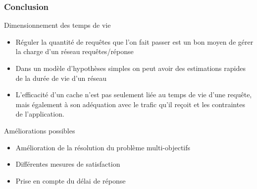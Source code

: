 \begin{frame}\frametitle{Conclusion}

  \begin{alertblock}{Dimensionnement des temps de vie}

    \begin{itemize}

      \item Réguler la quantité de requêtes que l'on fait passer est un bon moyen de gérer la charge d'un réseau requêtes/réponse

      \item Dans un modèle d'hypothèses simples on peut avoir des estimations rapides de la durée de vie d'un réseau

      \item L'efficacité d'un cache n'est pas seulement liée au temps de vie d'une requête, mais également à son adéquation avec le trafic qu'il reçoit et les contraintes de l'application.

    \end{itemize}

  \end{alertblock}

  \begin{block}{Améliorations possibles}
    \begin{itemize}
      \item Amélioration de la résolution du problème multi-objectifs
      \item Différentes mesures de satisfaction
      \item Prise en compte du délai de réponse
    \end{itemize}
  \end{block}


\end{frame}